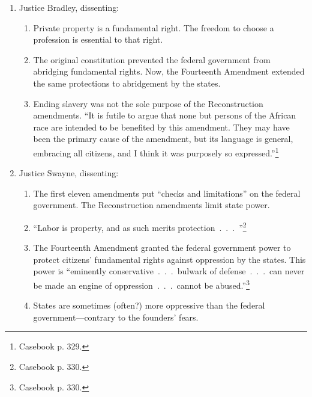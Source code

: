 \begin{enumerate}
\begin{enumerate}
        life.''\footnote{Casebook p. 326.} By the majority's rationale, 
        ``there is no monopoly, in the most odious form, which may not be 
        upheld.''\footnote{Casebook p. 327.}
        \item The Fourteenth Amendment \emph{does} protect U.S. citizens 
        against violations by state legislatures of ``common 
        rights'' (i.e., inalienable natural rights, like the right to property 
        and to pursue happiness)\footnote{Casebook p. 327.}
    \end{enumerate}
    \item Justice Bradley, dissenting:
    \begin{enumerate}
        \item Private property is a fundamental right. The freedom to choose a 
        profession is essential to that right.
        \item The original constitution prevented the federal government from 
        abridging fundamental rights. Now, the Fourteenth Amendment extended 
        the same protections to abridgement by the states.
        \item Ending slavery was not the sole purpose of the Reconstruction 
        amendments. ``It is futile to argue that none but persons of the 
        African race are intended to be benefited by this amendment. They may 
        have been the primary cause of the amendment, but its language is 
        general, embracing all citizens, and I think it was purposely so 
        expressed.''\footnote{Casebook p. 329.}
    \end{enumerate}
    \item Justice Swayne, dissenting:
    \begin{enumerate}
        \item The first eleven amendments put ``checks and limitations'' on 
        the federal government. The Reconstruction amendments limit state 
        power.
        \item ``Labor is property, and as such merits 
        protection~.~.~.~''\footnote{Casebook p. 330.}
        \item The Fourteenth Amendment granted the federal government power to 
        protect citizens' fundamental rights against oppression by the states. 
        This power is ``eminently conservative~.~.~.~bulwark of 
        defense~.~.~.~can never be made an engine of oppression~.~.~.~cannot 
        be abused.''\footnote{Casebook p. 330.}
        \item States are sometimes (often?) more oppressive than the federal 
        government---contrary to the founders' fears.
    \end{enumerate}
\end{enumerate}

